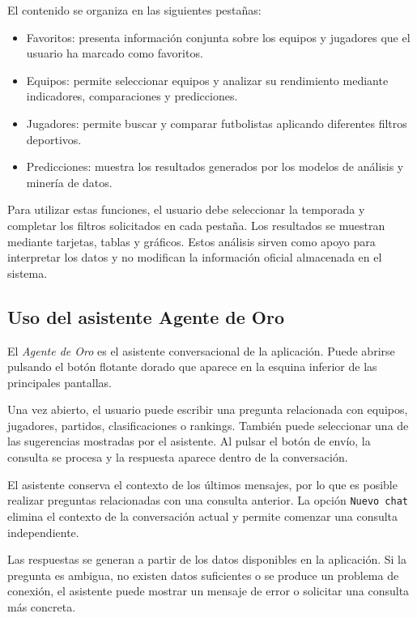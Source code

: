 El contenido se organiza en las siguientes pestañas:

\begin{itemize}
    \item Favoritos: presenta información conjunta sobre los equipos y jugadores que el usuario ha marcado como favoritos.
    \item Equipos: permite seleccionar equipos y analizar su rendimiento mediante indicadores, comparaciones y predicciones.
    \item Jugadores: permite buscar y comparar futbolistas aplicando diferentes filtros deportivos.
    \item Predicciones: muestra los resultados generados por los modelos de análisis y minería de datos.
\end{itemize}

Para utilizar estas funciones, el usuario debe seleccionar la temporada y completar los filtros solicitados en cada pestaña. Los resultados se muestran mediante tarjetas, tablas y gráficos. Estos análisis sirven como apoyo para interpretar los datos y no modifican la información oficial almacenada en el sistema.

\subsection{Uso del asistente Agente de Oro}

El \textit{Agente de Oro} es el asistente conversacional de la aplicación. Puede abrirse pulsando el botón flotante dorado que aparece en la esquina inferior de las principales pantallas.

Una vez abierto, el usuario puede escribir una pregunta relacionada con equipos, jugadores, partidos, clasificaciones o rankings. También puede seleccionar una de las sugerencias mostradas por el asistente. Al pulsar el botón de envío, la consulta se procesa y la respuesta aparece dentro de la conversación.

El asistente conserva el contexto de los últimos mensajes, por lo que es posible realizar preguntas relacionadas con una consulta anterior. La opción \texttt{Nuevo chat} elimina el contexto de la conversación actual y permite comenzar una consulta independiente.

Las respuestas se generan a partir de los datos disponibles en la aplicación. Si la pregunta es ambigua, no existen datos suficientes o se produce un problema de conexión, el asistente puede mostrar un mensaje de error o solicitar una consulta más concreta.


